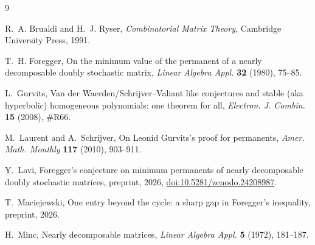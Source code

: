 \documentclass[11pt]{amsart}
\theoremstyle{remark}
\begin{document}
\begin{thebibliography}{9}

R.~A. Brualdi and H.~J. Ryser, \emph{Combinatorial Matrix Theory}, Cambridge
University Press, 1991.

T.~H. Foregger, On the minimum value of the permanent of a nearly decomposable
doubly stochastic matrix, \emph{Linear Algebra Appl.} \textbf{32} (1980),
75--85.

L.~Gurvits, Van der Waerden/Schrijver--Valiant like conjectures and stable
(aka hyperbolic) homogeneous polynomials: one theorem for all,
\emph{Electron. J. Combin.} \textbf{15} (2008), \#R66.

M.~Laurent and A.~Schrijver, On Leonid Gurvits's proof for permanents,
\emph{Amer. Math. Monthly} \textbf{117} (2010), 903--911.

Y.~Lavi, Foregger's conjecture on minimum permanents of nearly decomposable
doubly stochastic matrices, preprint, 2026,
\href{https://doi.org/10.5281/zenodo.24208987}{doi:10.5281/zenodo.24208987}.

T.~Maciejewski, One entry beyond the cycle: a sharp gap in Foregger's
inequality, preprint, 2026.

H.~Minc, Nearly decomposable matrices, \emph{Linear Algebra Appl.} \textbf{5}
(1972), 181--187.

\end{thebibliography}
\end{document}
